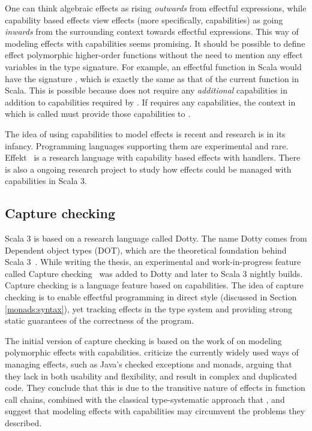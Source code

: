 One can think algebraic effects as rising \emph{outwards} from effectful expressions, while capability based effects view effects (more specifically, capabilities) as going \emph{inwards} from the surrounding context towards effectful expressions. This way of modeling effects with capabilities seems promising. It should be possible to define effect polymorphic higher-order functions without the need to mention any effect variables in the type signature. For example, an effectful  function in Scala would have the signature , which is exactly the same as that of the current  function in Scala. This is possible because  does not require any \emph{additional} capabilities in addition to capabilities required by . If  requires any capabilities, the context in which  is called must provide those capabilities to .~\cite{scoped-capabilities}

The idea of using capabilities to model effects is recent and research is in its infancy. Programming languages supporting them are experimental and rare. Effekt~\cite{effekt-lang} is a research language with capability based effects with handlers. There is also a ongoing research project to study how effects could be managed with capabilities in Scala 3.


\subsection{Capture checking}\label{capabilities:capture-checking}
Scala 3 is based on a research language called Dotty. The name Dotty comes from Dependent object types (DOT), which are the theoretical foundation behind Scala 3~\cite{essence-of-dot}. While writing the thesis, an experimental and work-in-progress feature called Capture checking~\cite{capture-checking} was added to Dotty and later to Scala 3 nightly builds. Capture checking is a language feature based on capabilities. The idea of capture checking is to enable effectful programming in direct style (discussed in Section \ref{monads:syntax}), yet tracking effects in the type system and providing strong static guarantees of the correctness of the program.

The initial version of capture checking is based on the work of \textcite{scoped-capabilities} on modeling polymorphic effects with capabilities. \citeauthor{scoped-capabilities} criticize the currently widely used ways of managing effects, such as Java's checked exceptions and monads, arguing that they lack in both usability and flexibility, and result in complex and duplicated code. They conclude that this is due to the transitive nature of effects in function call chains, combined with the classical type-systematic approach that , and suggest that modeling effects with capabilities may circumvent the problems they described.

